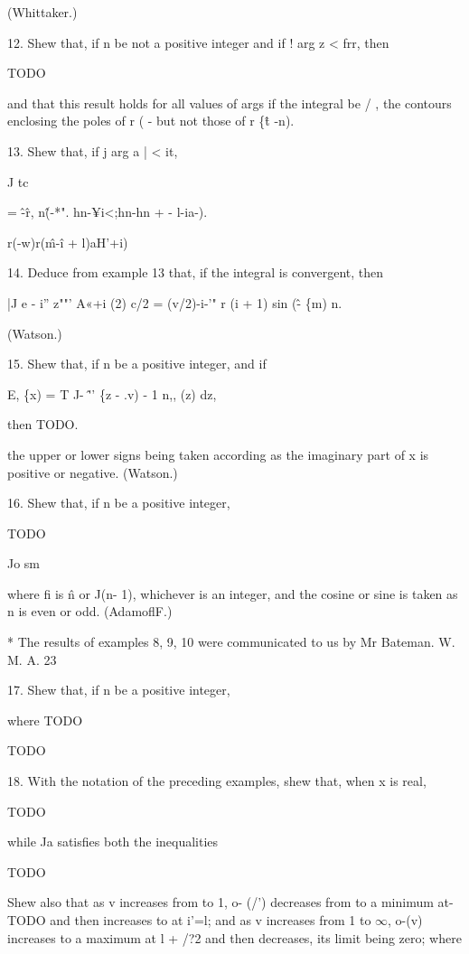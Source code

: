 (Whittaker.)

12. Shew that, if n be not a positive integer and if ! arg z < frr,
then

TODO

and that this result holds for all values of args if the integral be /
, the contours enclosing the poles of r ( - but not those of r \{\^t
-n).

13. Shew that, if j arg a | < it,

J tc

= \^-\^ r, n\^(-*". hn-¥i<;hn-hn + - l-ia-).

r(-w)r(\^m-\^i + l)aH'+i)

14. Deduce from example 13 that, if the integral is convergent, then

|J e - i'' z""' A«+i (2) c/2 = (v/2)-i-'" r (i + 1) sin (\^ - \{m) n.

(Watson.)

15. Shew that, if n be a positive integer, and if

E, \{x) = T J- \^'' \{z - .v) - 1 n,, (z) dz,

then TODO.

the upper or lower signs being taken according as the imaginary part
of x is positive or negative. (Watson.)

16. Shew that, if n be a positive integer,

TODO

Jo sm

where fi is \^n or J(n- 1), whichever is an integer, and the cosine or
sine is taken as n is even or odd. (AdamoflF.)

* The results of examples 8, 9, 10 were communicated to us by Mr
Bateman. W. M. A. 23

%
%

17. Shew that, if n be a positive integer,

where TODO

TODO 

18. With the notation of the preceding examples, shew that, when x is
real,

TODO

while Ja satisfies both the inequalities

TODO

Shew also that as v increases from to 1, o- (/') decreases from to a
minimum at- TODO and then increases to at i'=l; and as v increases
from 1 to $\infty$, o-(v) increases to a maximum at l + /?2 and then
decreases, its limit being zero; where

